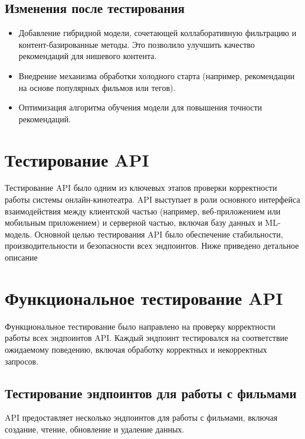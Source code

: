 \subsection*{Изменения после тестирования}
\begin{itemize}
    \item Добавление гибридной модели, сочетающей коллаборативную фильтрацию и контент-базированные методы. Это позволило улучшить качество рекомендаций для нишевого контента.
    \item Внедрение механизма обработки холодного старта (например, рекомендации на основе популярных фильмов или тегов).
    \item Оптимизация алгоритма обучения модели для повышения точности рекомендаций.
\end{itemize}

\section{Тестирование API}

Тестирование API было одним из ключевых этапов проверки корректности работы системы онлайн-кинотеатра. API выступает в роли основного интерфейса взаимодействия между клиентской частью (например, веб-приложением или мобильным приложением) и серверной частью, включая базу данных и ML-модель. Основной целью тестирования API было обеспечение стабильности, производительности и безопасности всех эндпоинтов. Ниже приведено детальное описание

\section{Функциональное тестирование API}

Функциональное тестирование было направлено на проверку корректности работы всех эндпоинтов API. Каждый эндпоинт тестировался на соответствие ожидаемому поведению, включая обработку корректных и некорректных запросов.

\subsection*{Тестирование эндпоинтов для работы с фильмами}
API предоставляет несколько эндпоинтов для работы с фильмами, включая создание, чтение, обновление и удаление данных.

